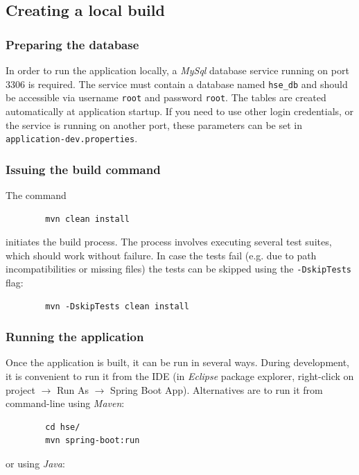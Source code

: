 \documentclass[a4paper]{usiinfbachelorproject}
\begin{document}
\begin{appendices}
        \subsection{Creating a local build}

        \subsubsection{Preparing the database}

        In order to run the application locally, a \emph{MySql} database service running on port 3306 is required. The service must contain a database
        named \texttt{hse\_db} and should be accessible via username \texttt{root} and password \texttt{root}. The tables
        are created automatically at application startup. If you need to use other login credentials, or the service is running on another port, these
        parameters can be set in \texttt{application-dev.properties}.

        \subsubsection{Issuing the build command}

        The command
        \begin{verbatim}
        mvn clean install
        \end{verbatim}
        initiates the build process. The process involves executing several test suites, which should work without failure. In case
        the tests fail (e.g. due to path incompatibilities or missing files) the tests can be skipped using the \texttt{-DskipTests} flag:
        \begin{verbatim}
        mvn -DskipTests clean install
        \end{verbatim}

        \subsubsection{Running the application}

        Once the application is built, it can be run in several ways. During development, it is convenient to run it from the IDE (in
        \emph{Eclipse} package explorer, right-click on project $\rightarrow$ Run As $\rightarrow$ Spring Boot App). Alternatives are to run it from command-line using \emph{Maven}:
        \begin{verbatim}
        cd hse/
        mvn spring-boot:run
        \end{verbatim}
        or using \emph{Java}:


\end{appendices}
\end{document}
